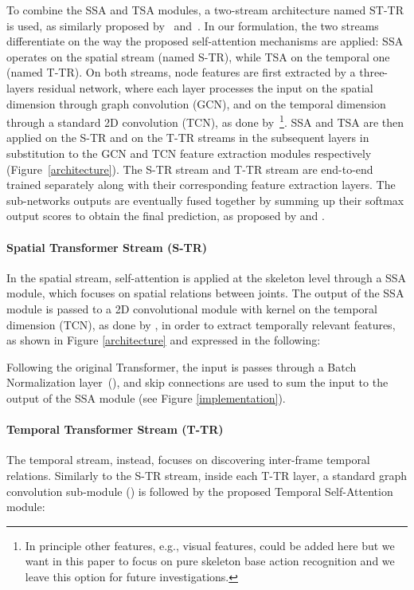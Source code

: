 \documentclass[times,twocolumn,final,authoryear]{elsarticle}
\begin{document}
To combine the SSA and TSA modules, a two-stream architecture named ST-TR is used, as similarly proposed by~\cite{Shi2018TwoStreamAG} and~\cite{dirgraph}. In our formulation, the two streams differentiate on the way the proposed self-attention mechanisms are applied: SSA operates on the spatial stream (named S-TR), while TSA on the temporal one (named T-TR). On both streams, node features are first extracted by a three-layers residual network, where each layer processes the input on the spatial dimension through graph convolution (GCN), and on the temporal dimension through a standard 2D convolution (TCN), as done by~\cite{yan2018spatial}\footnote{In principle other features, e.g., visual features, could be added here but we want in this paper to focus on pure skeleton base action recognition and we leave this option for future investigations.}. 
SSA and TSA are then applied on the S-TR and on the T-TR streams in the subsequent layers in substitution to the GCN and TCN feature extraction modules respectively (Figure~\ref{architecture}). The S-TR stream and T-TR stream are end-to-end trained separately along with their corresponding feature extraction layers. The sub-networks outputs are eventually fused together by summing up their softmax output scores to obtain the final prediction, as proposed by \cite{Shi2018TwoStreamAG} and \cite{dirgraph}. 



\paragraph*{\textbf{Spatial Transformer Stream (S-TR)}} In the spatial stream, self-attention is applied at the skeleton level through a SSA module, which focuses on spatial relations between joints. The output of the SSA module is passed to a 2D convolutional module with kernel  on the temporal dimension (TCN), as done by \cite{yan2018spatial}, in order to extract temporally relevant features, as shown in Figure \ref{architecture} and expressed in the following: 

Following the original Transformer, the input is passes through a Batch Normalization layer~(\cite{ioffe2015batch, bn_tr}), and skip connections are used to sum the input to the output of the SSA module (see Figure \ref{implementation}).


\paragraph*{\textbf{Temporal Transformer Stream (T-TR)}} 
The temporal stream, instead, focuses on discovering inter-frame temporal relations. Similarly to the S-TR stream, inside each T-TR layer, a standard graph convolution sub-module (\cite{yan2018spatial}) is followed by the proposed Temporal Self-Attention module:
\end{document}
